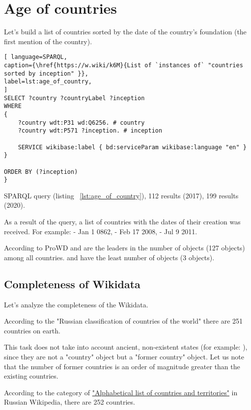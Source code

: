 \section{Age of countries}

Let's build a list of countries sorted by the date of the country's foundation (the first mention of the country).

\begin{lstlisting}[ language=SPARQL, 
caption={\href{https://w.wiki/k6M}{List of `instances of` "countries sorted by inception" }},
label=lst:age_of_country, 					
]
SELECT ?country ?countryLabel ?inception
WHERE
{
	?country wdt:P31 wd:Q6256. # country
	?country wdt:P571 ?inception. # inception
	
	SERVICE wikibase:label { bd:serviceParam wikibase:language "en" }
}

ORDER BY (?inception)
}
\end{lstlisting}

SPARQL query (listing ~\ref{lst:age_of_country}), 112 results (2017), 199 results (2020).

As a result of the query, a list of countries with the dates of their creation was received. For example:  - Jan 1 0862,  - Feb 17 2008,  - Jul 9 2011.

According to ProWD  and  are the leaders in the number of objects (127 objects) among all countries.  and  have the least number of objects (3 objects).


\subsection{Completeness of Wikidata}

Let's analyze the completeness of the Wikidata.

According to the "Russian classification of countries of the world" there are 251 countries on earth.

This task does not take into account ancient, non-existent states (for example: ), since they are not a "country" object but a "former country" object. Let us note that the number of former countries is an order of magnitude greater than the existing countries.

According to the category of \href{https://w.wiki/dWv}{"Alphabetical list of countries and territories"} in Russian Wikipedia, there are 252 countries.

